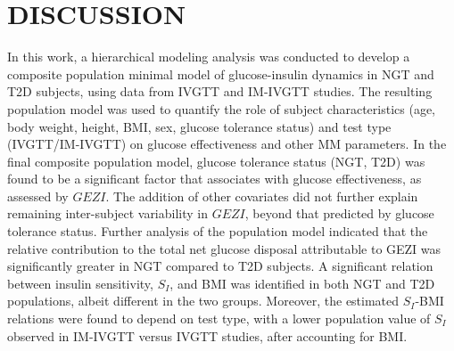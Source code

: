 \documentclass[utf8]{frontiersSCNS} %
\begin{document}
\section{DISCUSSION}
In this work, a hierarchical modeling analysis was conducted to develop a composite population minimal model of glucose-insulin dynamics in NGT and T2D subjects, using data from IVGTT and IM-IVGTT studies. The resulting population model was used to quantify the role of subject characteristics (age, body weight, height, BMI, sex, glucose tolerance status) and test type (IVGTT/IM-IVGTT) on glucose effectiveness and other MM parameters. In the final composite population model, glucose tolerance status (NGT, T2D) was found to be a significant factor that associates with glucose effectiveness, as assessed by $GEZI$. The addition of other covariates did not further explain remaining inter-subject variability in $GEZI$, beyond that predicted by glucose tolerance status. Further analysis of the population model indicated that the relative contribution to the total net glucose disposal attributable to GEZI was significantly greater in NGT compared to T2D subjects. A significant relation between insulin sensitivity, $S_I$, and BMI was identified in both NGT and T2D populations, albeit different in the two groups. Moreover, the estimated $S_I$-BMI relations were found to depend on test type, with a lower population value of $S_I$ observed in IM-IVGTT versus IVGTT studies, after accounting for BMI. 
\end{document}
